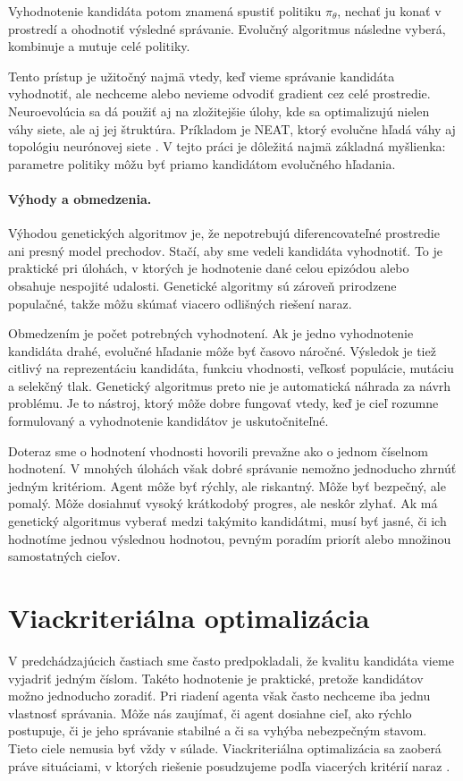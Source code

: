 Vyhodnotenie kandidáta potom znamená spustiť politiku $\pi_\theta$, nechať ju konať v prostredí a ohodnotiť výsledné správanie. Evolučný algoritmus následne vyberá, kombinuje a mutuje celé politiky.

Tento prístup je užitočný najmä vtedy, keď vieme správanie kandidáta vyhodnotiť, ale nechceme alebo nevieme odvodiť gradient cez celé prostredie. Neuroevolúcia sa dá použiť aj na zložitejšie úlohy, kde sa optimalizujú nielen váhy siete, ale aj jej štruktúra. Príkladom je NEAT, ktorý evolučne hľadá váhy aj topológiu neurónovej siete \cite{stanley2002neat}. V tejto práci je dôležitá najmä základná myšlienka: parametre politiky môžu byť priamo kandidátom evolučného hľadania.

\paragraph{Výhody a obmedzenia.}
Výhodou genetických algoritmov je, že nepotrebujú diferencovateľné prostredie ani presný model prechodov. Stačí, aby sme vedeli kandidáta vyhodnotiť. To je praktické pri úlohách, v ktorých je hodnotenie dané celou epizódou alebo obsahuje nespojité udalosti. Genetické algoritmy sú zároveň prirodzene populačné, takže môžu skúmať viacero odlišných riešení naraz.

Obmedzením je počet potrebných vyhodnotení. Ak je jedno vyhodnotenie kandidáta drahé, evolučné hľadanie môže byť časovo náročné. Výsledok je tiež citlivý na reprezentáciu kandidáta, funkciu vhodnosti, veľkosť populácie, mutáciu a selekčný tlak. Genetický algoritmus preto nie je automatická náhrada za návrh problému. Je to nástroj, ktorý môže dobre fungovať vtedy, keď je cieľ rozumne formulovaný a vyhodnotenie kandidátov je uskutočniteľné.

Doteraz sme o hodnotení vhodnosti hovorili prevažne ako o jednom číselnom hodnotení. V mnohých úlohách však dobré správanie nemožno jednoducho zhrnúť jedným kritériom. Agent môže byť rýchly, ale riskantný. Môže byť bezpečný, ale pomalý. Môže dosiahnuť vysoký krátkodobý progres, ale neskôr zlyhať. Ak má genetický algoritmus vyberať medzi takýmito kandidátmi, musí byť jasné, či ich hodnotíme jednou výslednou hodnotou, pevným poradím priorít alebo množinou samostatných cieľov.

\section{Viackriteriálna optimalizácia}

V predchádzajúcich častiach sme často predpokladali, že kvalitu kandidáta vieme vyjadriť jedným číslom. Takéto hodnotenie je praktické, pretože kandidátov možno jednoducho zoradiť. Pri riadení agenta však často nechceme iba jednu vlastnosť správania. Môže nás zaujímať, či agent dosiahne cieľ, ako rýchlo postupuje, či je jeho správanie stabilné a či sa vyhýba nebezpečným stavom. Tieto ciele nemusia byť vždy v súlade. Viackriteriálna optimalizácia sa zaoberá práve situáciami, v ktorých riešenie posudzujeme podľa viacerých kritérií naraz \cite{coello1999survey}.

